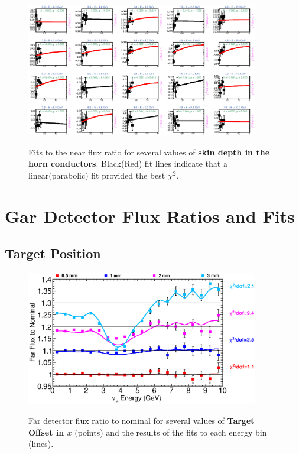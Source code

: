 \begin{figure}[hb]
  \begin{center}
    {\includegraphics[width=4.0in]{figures/SkinDepthIC__near_fits.eps}}
  \end{center}
\caption{ Fits to the near flux ratio for several values of {\bf skin depth in the horn conductors}. Black(Red) fit lines indicate that a linear(parabolic) fit provided the best $\chi^2$. }
\end{figure}

\section{Gar Detector Flux Ratios and Fits}
\label{app:far_plots}

\subsection{Target Position}

\begin{figure}[ht]
  \begin{center}
    {\includegraphics[width=4.0in]{figures/TargetXOffset_far_summary.eps}}
  \end{center}
\caption{ Far detector flux ratio to nominal for several values of {\bf Target Offset in $x$} (points) and the results of the fits to each energy bin (lines).}
\end{figure}

